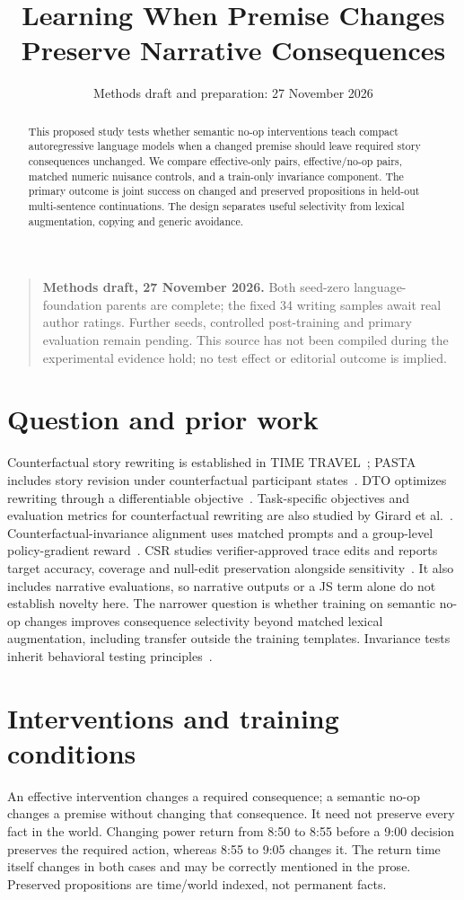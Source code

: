 \documentclass[11pt,a4paper]{article}
\title{Learning When Premise Changes Preserve Narrative Consequences}
\author{}
\date{Methods draft and preparation: 27 November 2026}
\renewcommand{\projectstatus}{\begin{quote}\small\textbf{Methods draft,
27 November 2026.} Both seed-zero language-foundation parents are complete;
the fixed 34 writing samples await real author ratings. Further seeds,
controlled post-training and primary evaluation remain pending.
This source has not been compiled during the experimental evidence
hold; no test effect or editorial outcome is implied.\end{quote}}
\begin{document}
\maketitle
\projectstatus
\begin{abstract}
This proposed study tests whether semantic no-op interventions teach compact
autoregressive language models when a changed premise should leave required
story consequences unchanged. We compare effective-only pairs, effective/no-op
pairs, matched numeric nuisance controls, and a train-only invariance component.
The primary outcome is joint success on changed and preserved propositions in
held-out multi-sentence continuations. The design separates useful selectivity
from lexical augmentation, copying and generic avoidance.
\end{abstract}

\section{Question and prior work}
Counterfactual story rewriting is established in TIME TRAVEL~\cite{timetravel};
PASTA includes story revision under counterfactual participant states~\cite{pasta}.
DTO optimizes rewriting through a differentiable objective~\cite{dto}.
Task-specific objectives and evaluation metrics for counterfactual rewriting
are also studied by Girard et al.~\cite{girard_tallip}.
Counterfactual-invariance alignment uses matched prompts and a group-level
policy-gradient reward~\cite{cfi}. CSR studies verifier-approved trace edits and
reports target accuracy, coverage and null-edit preservation alongside
sensitivity~\cite{csr}. It also includes narrative evaluations, so narrative
outputs or a JS term alone do not establish novelty here. The narrower question
is whether training on semantic no-op changes
improves consequence selectivity beyond matched lexical augmentation, including
transfer outside the training templates. Invariance tests inherit behavioral
testing principles~\cite{checklist}.

\section{Interventions and training conditions}
An effective intervention changes a required consequence; a semantic no-op
changes a premise without changing that consequence. It need not preserve every
fact in the world. Changing power return from 8:50 to 8:55 before a 9:00 decision
preserves the required action, whereas 8:55 to 9:05 changes it. The return time
itself changes in both cases and may be correctly mentioned in the prose.
Preserved propositions are time/world indexed, not permanent facts.
\end{document}
